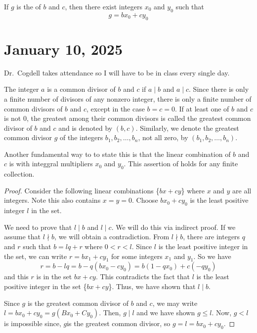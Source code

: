 \documentclass[11pt]{article}
\begin{document}
\begin{theorem}\label{1.3}
    If $g$ is the  of \( b \) and \( c \), then there exist integers \( x_0 \) and \( y_0 \) such that \[g = bx_0 + cy_0\]
\end{theorem}

\section{January 10, 2025}
Dr.\ Cogdell takes attendance so I will have to be in class every single day.

\begin{definition}
    The integer $a$ is a common divisor of $b$ and $c$ if $a \mid b$ and $a \mid c$. Since there is only a finite number of divisors of any nonzero integer, there is only a finite number of common divisors of $b$ and $c$, except in the case $b = c = 0$. If at least one of $b$ and $c$ is not $0$, the greatest among their common divisors is called the greatest common divisor of $b$ and $c$ and is denoted by $(b, c)$. Similarly, we denote the greatest common divisor $g$ of the integers $b_1, b_2, \ldots, b_n$, not all zero, by $(b_1, b_2, \ldots, b_n)$.
\end{definition}

\begin{fact}
    Another fundamental way to to state this is that the linear combination of \( b \) and \( c \) is with integgral multipliers \( x_0 \) and \( y_0 \). This assertion of holds for any finite collection.
\end{fact}
\begin{proof}
    Consider the following linear combinations \{\(bx + cy\)\} where \(x\) and \(y\) are all integers. Note this also contains \(x = y = 0\). Choose \(bx_0 + cy_0 \) is the least positive integer \(l\) in the set.

    We need to prove that \(l \mid b\) and \(l \mid c\). We will do this via
    indirect proof. If we assume that \(l \nmid b\), we will obtain a
    contradiction. From \(l \nmid b\), there are integers \(q\) and \(r\) such that
    \(b = lq + r\) where \(0 < r < l\). Since \(l\) is the least positive integer
    in the set, we can write \(r = bx_1 + cy_1\) for some integers \(x_1\) and
    \(y_1\). So we have \[r = b - lq = b - q(bx_0 - cy_0) = b(1 - qx_0) + c(-qy_0)\]  and this \(r\) is in the set {\(bx + cy\)}. This contradicts the fact that
    \(l\) is the least positive integer in the set \{\(bx + cy\)\}. Thus, we have
    shown that \(l \mid b\).

    Since \(g\) is the greatest common divisor of \(b\) and \(c\), we may write \(l
    = bx_0 + cy_0 = g(Bx_0 + Cy_0)\). Then, \(g \mid l\) and we have shown \(g \leq
    l\). Now, \(g < l\) is impossible since, \(g\)is the greatest common divisor,
    so \(g = l = bx_0 + cy_0\).
\end{proof}
\end{document}
